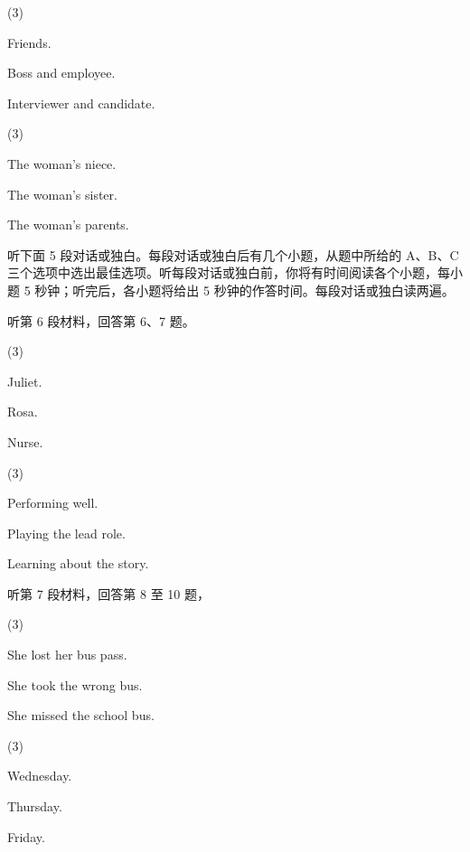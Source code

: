 \documentclass{英语试卷}
\begin{document}
\begin{choices}(3)
  \item Friends.
  \item Boss and employee.
  \item Interviewer and candidate.
\end{choices}
\begin{choices}(3)
  \item The woman's niece.
  \item The woman's sister.
  \item The woman's parents.
\end{choices}
\par 听下面 5 段对话或独白。每段对话或独白后有几个小题，从题中所给的 A、B、C 三个选项中选出最佳选项。听每段对话或独白前，你将有时间阅读各个小题，每小题 5 秒钟；听完后，各小题将给出 5 秒钟的作答时间。每段对话或独白读两遍。\par
\par 听第 6 段材料，回答第 6、7 题。\par
{}
\begin{choices}(3)
  \item Juliet.
  \item Rosa.
  \item Nurse.
\end{choices}
\begin{choices}(3)
  \item Performing well.
  \item Playing the lead role.
  \item Learning about the story.
\end{choices}
\par 听第 7 段材料，回答第 8 至 10 题，\par
{}
\begin{choices}(3)
  \item She lost her bus pass.
  \item She took the wrong bus.
  \item She missed the school bus.
\end{choices}
\begin{choices}(3)
  \item Wednesday.
  \item Thursday.
  \item Friday.
\end{choices}
\end{document}
